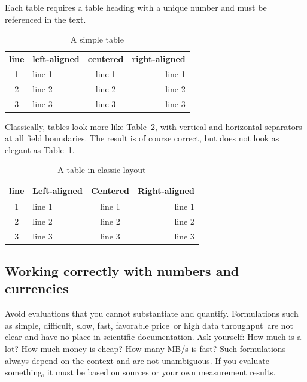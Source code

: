 \documentclass{llncs}
\begin{document}
Each table requires a table heading with a unique number and must be referenced in the text.

\begin{table}
\centering
\caption{A simple table}
\label{Simple_Table_Label}
\begin{tabular}{clcr}
\hline\noalign{\smallskip}
  \textbf{line} & \textbf{left-aligned} & \textbf{centered} & \textbf{right-aligned} \\
\noalign{\smallskip}
\hline
\noalign{\smallskip}
  1 & line 1 & line 1 & line 1 \\ \hline
  2 & line 2 & line 2 & line 2 \\ \hline
  3 & line 3 & line 3 & line 3 \\ \hline
\hline
\end{tabular}
\end{table}

Classically, tables look more like Table~\ref{Standard_Table_Label}, with vertical and horizontal separators at all field boundaries. The result is of course correct, but does not look as elegant as Table~\ref{Simple_Table_Label}.


\begin{table}
\centering
\caption{A table in classic layout}\label{Standard_Table_Label}
\begin{tabular}{|c|l|c|r|}
\hline
  \textbf{line} & \textbf{Left-aligned} & \textbf{Centered} & \textbf{Right-aligned} \\
\hline
  1 & line 1 & line 1 & line 1 \\ \hline
  2 & line 2 & line 2 & line 2 \\ \hline
  3 & line 3 & line 3 & line 3 \\ \hline
\end{tabular}
\end{table}


\subsection{Working correctly with numbers and currencies}

Avoid evaluations that you cannot substantiate and quantify. Formulations such as \glqq simple\grqq, \glqq difficult\grqq, \glqq slow\grqq, \glqq fast\grqq, \glqq favorable price\grqq\ or \glqq high data throughput\grqq\ are not clear and have no place in scientific documentation. Ask yourself: How much is a lot? How much money is cheap? How many MB/s is fast? Such formulations always depend on the context and are not unambiguous. If you evaluate something, it must be based on sources or your own measurement results.
\end{document}
